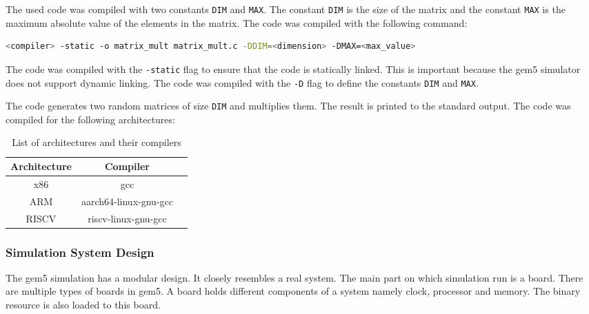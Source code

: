 The used code was compiled with two constants \texttt{DIM} and \texttt{MAX}. The constant \texttt{DIM} is the size of the matrix and the constant \texttt{MAX} is the maximum absolute value of the elements in the matrix. The code was compiled with the following command:

\begin{lstlisting}[language=bash , caption={Compilation Command}, label={lst:compilation}]
    <compiler> -static -o matrix_mult matrix_mult.c -DDIM=<dimension> -DMAX=<max_value>
\end{lstlisting}


The code was compiled with the \texttt{-static} flag to ensure that the code is statically linked. This is important because the gem5 simulator does not support dynamic linking. The code was compiled with the \texttt{-D} flag to define the constants \texttt{DIM} and \texttt{MAX}.

The code generates two random matrices of size \texttt{DIM} and multiplies them. The result is printed to the standard output. The code was compiled for the following architectures:

\begin{table}[h!]
	\centering
	\begin{tabular}{|c|c|c|}
		\hline
		\textbf{Architecture} & \textbf{Compiler}     \\
		\hline
		x86                   & gcc                   \\
		ARM                   & aarch64-linux-gnu-gcc \\
		RISCV                 & riscv-linux-gnu-gcc   \\
		\hline
	\end{tabular}
	\vspace{0.2cm}
	\caption{List of architectures and their compilers}
\end{table}

\subsubsection{\textbf{Simulation System Design}} The gem5 simulation has a modular design. It closely resembles a real system. The main part on which simulation run is a board. There are multiple types of boards in gem5. A board holds different components of a system namely clock, processor and memory. The binary resource is also loaded to this board.

